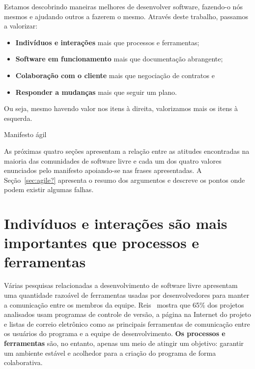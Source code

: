 \begin{caixa}[hb]
  \begin{minipage}{\linewidth}
    \centering Estamos descobrindo maneiras melhores de desenvolver
    software, fazendo-o nós mesmos e ajudando outros a fazerem o
    mesmo. Através deste trabalho, passamos a valorizar:

    \begin{center}
      \begin{itemize}
      \item \textbf{Indivíduos e interações} mais que processos e
        ferramentas;
      \item \textbf{Software em funcionamento} mais que documentação
        abrangente;
      \item \textbf{Colaboração com o cliente} mais que negociação de
        contratos e
      \item \textbf{Responder a mudanças} mais que seguir um plano.
      \end{itemize}
    \end{center}

    Ou seja, mesmo havendo valor nos itens à direita, valorizamos mais
    os itens à esquerda.
  \end{minipage}
  \caption{Manifesto ágil}
  \label{box:manifesto}
\end{caixa}

As próximas quatro seções apresentam a relação entre as atitudes
encontradas na maioria das comunidades de software livre e cada um dos
quatro valores enunciados pelo manifesto apoiando-se nas frases
apresentadas. A Seção~\ref{sec:agile?} apresenta o resumo dos
argumentos e descreve os pontos onde podem existir algumas falhas.

\section{Indivíduos e interações são mais importantes que processos e
  ferramentas}
\label{sec:first-princ}

Várias pesquisas relacionadas a desenvolvimento de software livre
apresentam uma quantidade razoável de ferramentas usadas por
desenvolvedores para manter a comunicação entre os membros da
equipe. Reis~\cite{Reis2003} mostra que 65\% dos projetos analisados
usam programas de controle de versão, a página na Internet do projeto
e listas de correio eletrônico como as principais ferramentas de
comunicação entre os usuários do programa e a equipe de
desenvolvimento. \textbf{Os processos e ferramentas} são, no entanto,
apenas um meio de atingir um objetivo: garantir um ambiente estável e
acolhedor para a criação do programa de forma colaborativa.

